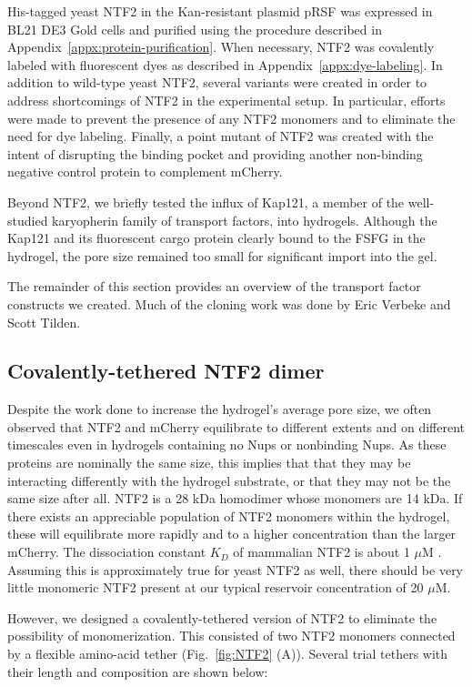 His-tagged yeast NTF2 in the Kan-resistant plasmid pRSF was expressed in BL21 DE3 Gold cells and purified using the procedure described in Appendix~\ref{appx:protein-purification}.  When necessary, NTF2 was covalently labeled with fluorescent dyes as described in Appendix~\ref{appx:dye-labeling}.  In addition to wild-type yeast NTF2, several variants were created in order to address shortcomings of NTF2 in the experimental setup.  In particular, efforts were made to prevent the presence of any NTF2 monomers and to eliminate the need for dye labeling.  Finally, a point mutant of NTF2 was created with the intent of disrupting the binding pocket and providing another non-binding negative control protein to complement mCherry.

Beyond NTF2, we briefly tested the influx of Kap121, a member of the well-studied karyopherin family of transport factors, into hydrogels.  Although the Kap121 and its fluorescent cargo protein clearly bound to the FSFG in the hydrogel, the pore size remained too small for significant import into the gel.

The remainder of this section provides an overview of the transport factor constructs we created.  Much of the cloning work was done by Eric Verbeke and Scott Tilden.

\subsection{Covalently-tethered NTF2 dimer}

Despite the work done to increase the hydrogel's average pore size, we often observed that NTF2 and mCherry equilibrate to different extents and on different timescales even in hydrogels containing no Nups or nonbinding Nups.  As these proteins are nominally the same size, this implies that that they may be interacting differently with the hydrogel substrate, or that they may not be the same size after all. NTF2 is a 28 kDa homodimer whose monomers are 14 kDa.  If there exists an appreciable population of NTF2 monomers within the hydrogel, these will equilibrate more rapidly and to a higher concentration than the larger mCherry.  The dissociation constant $K_D$ of mammalian NTF2 is about 1 $\mu$M \cite{chaillan-huntington01}.  Assuming this is approximately true for yeast NTF2 as well, there should be very little monomeric NTF2 present at our typical reservoir concentration of 20 $\mu$M.

However, we designed a covalently-tethered version of NTF2 to eliminate the possibility of monomerization.  This consisted of two NTF2 monomers connected by a flexible amino-acid tether (Fig.~\ref{fig:NTF2} (A)).  Several trial tethers with their length and composition are shown below:


